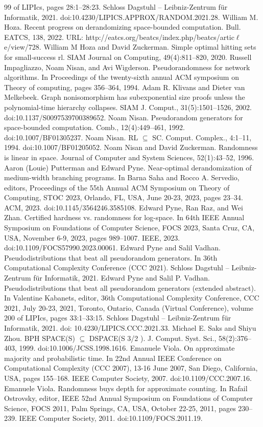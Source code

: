 \begin{thebibliography}{99}
 of LIPIcs, pages 28:1–28:23. Schloss Dagstuhl – Leibniz-Zentrum für Informatik, 2021. doi:10.4230/LIPICS.APPROX/RANDOM.2021.28.
 William M. Hoza. Recent progress on derandomizing space-bounded computation. Bull. EATCS, 138, 2022. URL: http://eatcs.org/beatcs/index.php/beatcs/artic$\ell$e/view/728.
 William M Hoza and David Zuckerman. Simple optimal hitting sets for small-success rl. SIAM Journal on Computing, 49(4):811–820, 2020.
 Russell Impagliazzo, Noam Nisan, and Avi Wigderson. Pseudorandomness for network algorithms. In Proceedings of the twenty-sixth annual ACM symposium on Theory of computing, pages 356–364, 1994.
 Adam R. Klivans and Dieter van Melkebeek. Graph nonisomorphism has subexponential size proofs unless the polynomial-time hierarchy collapses. SIAM J. Comput., 31(5):1501–1526, 2002. doi:10.1137/S0097539700389652.
 Noam Nisan. Pseudorandom generators for space-bounded computation. Comb., 12(4):449–461, 1992. doi:10.1007/BF01305237.
 Noam Nisan. RL $\subseteq$ SC. Comput. Complex., 4:1–11, 1994. doi:10.1007/BF01205052.
 Noam Nisan and David Zuckerman. Randomness is linear in space. Journal of Computer and System Sciences, 52(1):43–52, 1996.
 Aaron (Louie) Putterman and Edward Pyne. Near-optimal derandomization of medium-width branching programs. In Barna Saha and Rocco A. Servedio, editors, Proceedings of the 55th Annual ACM Symposium on Theory of Computing, STOC 2023, Orlando, FL, USA, June 20-23, 2023, pages 23–34. ACM, 2023. doi:10.1145/3564246.3585108.
 Edward Pyne, Ran Raz, and Wei Zhan. Certified hardness vs. randomness for log-space. In 64th IEEE Annual Symposium on Foundations of Computer Science, FOCS 2023, Santa Cruz, CA, USA, November 6-9, 2023, pages 989–1007. IEEE, 2023. doi:10.1109/FOCS57990.2023.00061.
 Edward Pyne and Salil Vadhan. Pseudodistributions that beat all pseudorandom generators. In 36th Computational Complexity Conference (CCC 2021). Schloss Dagstuhl – Leibniz-Zentrum für Informatik, 2021.
 Edward Pyne and Salil P. Vadhan. Pseudodistributions that beat all pseudorandom generators (extended abstract). In Valentine Kabanets, editor, 36th Computational Complexity Conference, CCC 2021, July 20-23, 2021, Toronto, Ontario, Canada (Virtual Conference), volume 200 of LIPIcs, pages 33:1–33:15. Schloss Dagstuhl – Leibniz-Zentrum für Informatik, 2021. doi: 10.4230/LIPICS.CCC.2021.33.
 Michael E. Saks and Shiyu Zhou. BPH SPACE(S) $\subseteq$ DSPACE(S 3/2 ). J. Comput. Syst. Sci., 58(2):376–403, 1999. doi:10.1006/JCSS.1998.1616.
 Emanuele Viola. On approximate majority and probabilistic time. In 22nd Annual IEEE Conference on Computational Complexity (CCC 2007), 13-16 June 2007, San Diego, California, USA, pages 155–168. IEEE Computer Society, 2007. doi:10.1109/CCC.2007.16.
 Emanuele Viola. Randomness buys depth for approximate counting. In Rafail Ostrovsky, editor, IEEE 52nd Annual Symposium on Foundations of Computer Science, FOCS 2011, Palm Springs, CA, USA, October 22-25, 2011, pages 230–239. IEEE Computer Society, 2011. doi:10.1109/FOCS.2011.19.
\end{thebibliography}
